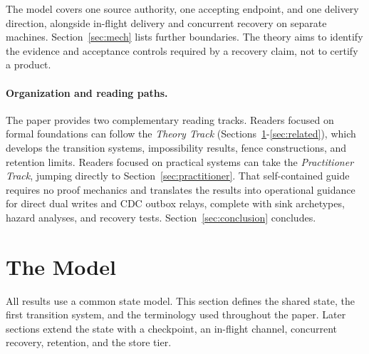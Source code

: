 \documentclass[sigplan,10pt]{acmart}
\theoremstyle{plain}
\theoremstyle{definition}
\begin{document}
The model covers one source authority, one accepting endpoint, and
one delivery direction, alongside in-flight delivery and concurrent
recovery on separate machines. Section~\ref{sec:mech} lists further
boundaries. The theory aims to identify the evidence and acceptance
controls required by a recovery claim, not to certify a product.

\paragraph{Organization and reading paths.}
The paper provides two complementary reading tracks.
Readers focused on formal foundations can follow the
\emph{Theory Track} (Sections~\ref{sec:model}-\ref{sec:related}),
which develops the transition systems, impossibility results,
fence constructions, and retention limits.
Readers focused on practical systems can take the
\emph{Practitioner Track}, jumping directly to
Section~\ref{sec:practitioner}. That self-contained guide requires no
proof mechanics and translates the results into operational guidance for
direct dual writes and CDC outbox relays, complete with sink archetypes,
hazard analyses, and recovery tests.
Section~\ref{sec:conclusion} concludes.

\section{The Model}\label{sec:model}

All results use a common state model. This section defines the shared
state, the first transition system, and the terminology used throughout
the paper. Later sections extend the state with a checkpoint, an
in-flight channel, concurrent recovery, retention, and the store tier.
\end{document}
